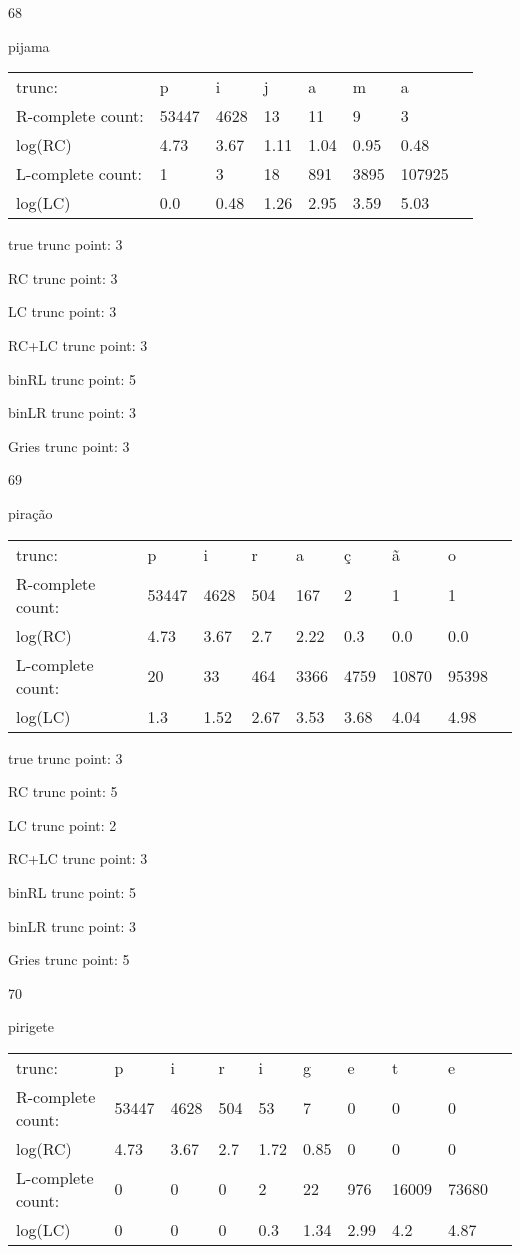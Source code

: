 \documentclass[10pt]{article}
\begin{document}
68

pijama

\begin{tabular}{l|lllllll}
trunc: & p & i & j & a & m & a & \\ 
R-complete count: & 53447 & 4628 & 13 & 11 & 9 & 3 & \\ 
log(RC) & 4.73 & 3.67 & 1.11 & 1.04 & 0.95 & 0.48 & \\ 
L-complete count: & 1 & 3 & 18 & 891 & 3895 & 107925 & \\ 
log(LC) & 0.0 & 0.48 & 1.26 & 2.95 & 3.59 & 5.03 & \\ 
\end{tabular}

true trunc point: 3

RC trunc point: 3

LC trunc point: 3

RC+LC trunc point: 3

binRL trunc point: 5

binLR trunc point: 3

Gries trunc point: 3

\newpage

69

piração

\begin{tabular}{l|llllllll}
trunc: & p & i & r & a & ç & ã & o & \\ 
R-complete count: & 53447 & 4628 & 504 & 167 & 2 & 1 & 1 & \\ 
log(RC) & 4.73 & 3.67 & 2.7 & 2.22 & 0.3 & 0.0 & 0.0 & \\ 
L-complete count: & 20 & 33 & 464 & 3366 & 4759 & 10870 & 95398 & \\ 
log(LC) & 1.3 & 1.52 & 2.67 & 3.53 & 3.68 & 4.04 & 4.98 & \\ 
\end{tabular}

true trunc point: 3

RC trunc point: 5

LC trunc point: 2

RC+LC trunc point: 3

binRL trunc point: 5

binLR trunc point: 3

Gries trunc point: 5

\vspace{1em}

70

pirigete

\begin{tabular}{l|lllllllll}
trunc: & p & i & r & i & g & e & t & e & \\ 
R-complete count: & 53447 & 4628 & 504 & 53 & 7 & 0 & 0 & 0 & \\ 
log(RC) & 4.73 & 3.67 & 2.7 & 1.72 & 0.85 & 0 & 0 & 0 & \\ 
L-complete count: & 0 & 0 & 0 & 2 & 22 & 976 & 16009 & 73680 & \\ 
log(LC) & 0 & 0 & 0 & 0.3 & 1.34 & 2.99 & 4.2 & 4.87 & \\ 
\end{tabular}
\end{document}
